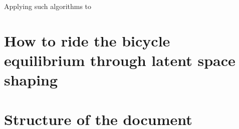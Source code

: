 
Applying such algorithms to 




\section{How to ride the bicycle \\ \small{ equilibrium through latent space shaping }}
\cite{rideabike_nature_2016}



\section{Structure of the document}